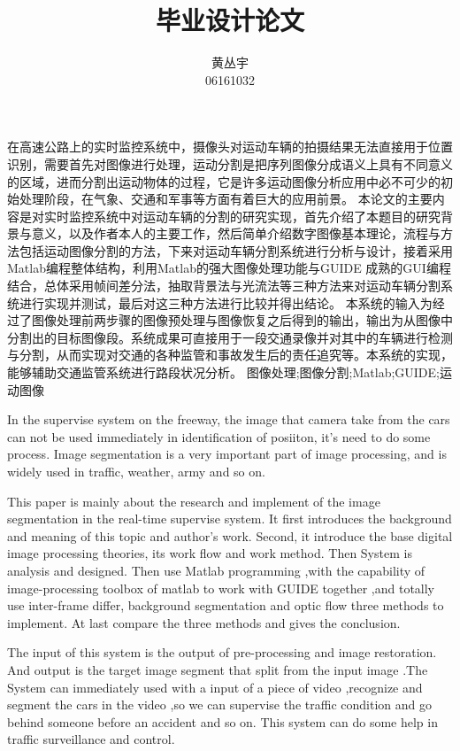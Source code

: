 \documentclass[18pt, twoside, a4paper, dvipdfm]{book}
\begin{document}
\title{毕业设计论文}
\author{黄丛宇\\06161032}

\lfour

\zhabstract 
在高速公路上的实时监控系统中，摄像头对运动车辆的拍摄结果无法直接用于位置识别，需要首先对图像进行处理，运动分割是把序列图像分成语义上具有不同意义的区域，进而分割出运动物体的过程，它是许多运动图像分析应用中必不可少的初始处理阶段，在气象、交通和军事等方面有着巨大的应用前景。
本论文的主要内容是对实时监控系统中对运动车辆的分割的研究实现，首先介绍了本题目的研究背景与意义，以及作者本人的主要工作，然后简单介绍数字图像基本理论，流程与方法包括运动图像分割的方法，下来对运动车辆分割系统进行分析与设计，接着采用Matlab编程整体结构，利用Matlab的强大图像处理功能与GUIDE 成熟的GUI编程结合，总体采用帧间差分法，抽取背景法与光流法等三种方法来对运动车辆分割系统进行实现并测试，最后对这三种方法进行比较并得出结论。
本系统的输入为经过了图像处理前两步骤的图像预处理与图像恢复之后得到的输出，输出为从图像中分割出的目标图像段。系统成果可直接用于一段交通录像并对其中的车辆进行检测与分割，从而实现对交通的各种监管和事故发生后的责任追究等。本系统的实现，能够辅助交通监管系统进行路段状况分析。
{\zhkeywords 图像处理;图像分割;Matlab;GUIDE;运动图像}

\enabstract
In the supervise system on the freeway, the image that camera take from the cars can not be used immediately in identification of posiiton, it’s need to do some process. Image segmentation is a very important part of image processing, and is widely used in traffic, weather, army and so on. 

This paper is mainly about the research and implement of the image segmentation in the real-time supervise system. It first introduces the background and meaning of this topic and author’s work. Second, it introduce the base digital image processing theories, its work flow and work method. Then System is analysis and designed. Then use Matlab  programming ,with the capability of image-processing toolbox of matlab to work with GUIDE together ,and totally use inter-frame differ, background segmentation and optic flow three methods to implement. At last compare the three methods and gives the conclusion.

The input of this system is the output of pre-processing and image restoration. And output is the target image segment that split from the input image .The System can immediately used with a input of a piece of video ,recognize and segment the cars in the video ,so we can supervise the traffic condition and go behind someone before an accident and so on. This system can do some help in traffic surveillance and control.
\end{document}
